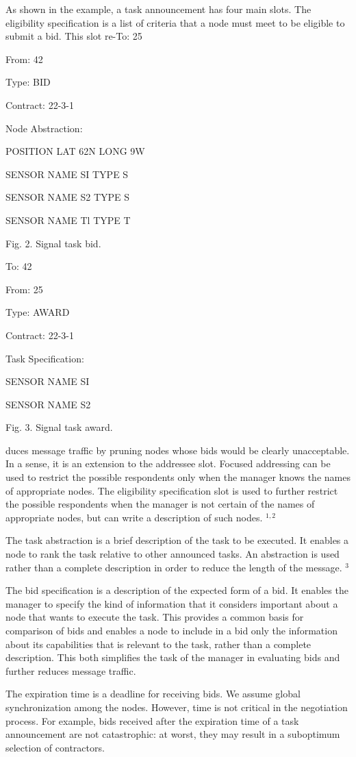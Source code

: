 \documentclass[
]{article}
\begin{document}
As shown in the example, a task announcement has four main slots. The
eligibility specification is a list of criteria that a node must meet to
be eligible to submit a bid. This slot re-To: 25

From: 42

Type: BID

Contract: 22-3-1

Node Abstraction:

POSITION LAT 62N LONG 9W

SENSOR NAME SI TYPE S

SENSOR NAME S2 TYPE S

SENSOR NAME Tl TYPE T

Fig. 2. Signal task bid.

To: 42

From: 25

Type: AWARD

Contract: 22-3-1

Task Specification:

SENSOR NAME SI

SENSOR NAME S2

Fig. 3. Signal task award.

duces message traffic by pruning nodes whose bids would be clearly
unacceptable. In a sense, it is an extension to the addressee slot.
Focused addressing can be used to restrict the possible respondents only
when the manager knows the names of appropriate nodes. The eligibility
specification slot is used to further restrict the possible respondents
when the manager is not certain of the names of appropriate nodes, but
can write a description of such nodes. \(^{1,2}\)

The task abstraction is a brief description of the task to be executed.
It enables a node to rank the task relative to other announced tasks. An
abstraction is used rather than a complete description in order to
reduce the length of the message. \(^{3}\)

The bid specification is a description of the expected form of a bid. It
enables the manager to specify the kind of information that it considers
important about a node that wants to execute the task. This provides a
common basis for comparison of bids and enables a node to include in a
bid only the information about its capabilities that is relevant to the
task, rather than a complete description. This both simplifies the task
of the manager in evaluating bids and further reduces message traffic.

The expiration time is a deadline for receiving bids. We assume global
synchronization among the nodes. However, time is not critical in the
negotiation process. For example, bids received after the expiration
time of a task announcement are not catastrophic: at worst, they may
result in a suboptimum selection of contractors.
\end{document}
